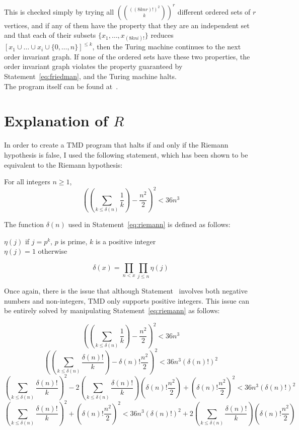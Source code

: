 This is checked simply by trying all $({((8knr)!)^2 \choose k})^r$ different ordered sets of $r$ vertices, and if any of them have the property that they are an independent set and that each of their subsets $\{x_1, \dots, x_{(8kni)!}\}$ reduces $[x_1 \cup \dots \cup x_i \cup \{0,\dots,n\}]^{\le k}$, then the Turing machine continues to the next order invariant graph. If none of the ordered sets have these two properties, the order invariant graph violates the property guaranteed by Statement~\ref{eq:friedman}, and the Turing machine halts. \\

The program itself can be found at~\cite{github}.

\section{Explanation of $R$}

In order to create a TMD program that halts if and only if the Riemann hypothesis is false, I used the following statement, which has been shown to be equivalent to the Riemann hypothesis:~\cite{riemann}\\

\begin{statement} \label{eq:riemann}
For all integers $n \ge 1$, 
$$\left(\left(\sum_{k \le \delta(n)} \frac{1}{k}\right) - \frac{n^2}{2}\right)^2 < 36n^3$$
\end{statement}

The function $\delta(n)$ used in Statement~\ref{eq:riemann} is defined as follows: \\

\begin{nscenter}
$\eta(j)$ if $j = p^k$, $p$ is prime, $k$ is a positive integer \\
$\eta(j) = 1$ otherwise
\end{nscenter}
$$\delta(x) = \prod_{n<x}\prod_{j \le n} \eta(j)$$

Once again, there is the issue that although Statement~\label{eq:riemann} involves both negative numbers and non-integers, TMD only supports positive integers. This issue can be entirely solved by manipulating Statement~\ref{eq:riemann} as follows:

$$\left(\left(\sum_{k \le \delta(n)} \frac{1}{k}\right) - \frac{n^2}{2}\right)^2 < 36n^3$$
$$\left(\left(\sum_{k \le \delta(n)} \frac{\delta(n)!}{k}\right) - \delta(n)!\frac{n^2}{2}\right)^2 < 36n^3(\delta(n)!)^2$$
$$\left(\sum_{k \le \delta(n)} \frac{\delta(n)!}{k}\right)^2 - 2\left(\sum_{k \le \delta(n)} \frac{\delta(n)!}{k}\right) \left(\delta(n)!\frac{n^2}{2}\right) + \left(\delta(n)!\frac{n^2}{2}\right)^2 < 36n^3(\delta(n)!)^2$$
$$\left(\sum_{k \le \delta(n)} \frac{\delta(n)!}{k}\right)^2 + \left(\delta(n)!\frac{n^2}{2}\right)^2 < 36n^3(\delta(n)!)^2 + 2\left(\sum_{k \le \delta(n)} \frac{\delta(n)!}{k}\right) \left(\delta(n)!\frac{n^2}{2}\right)$$

